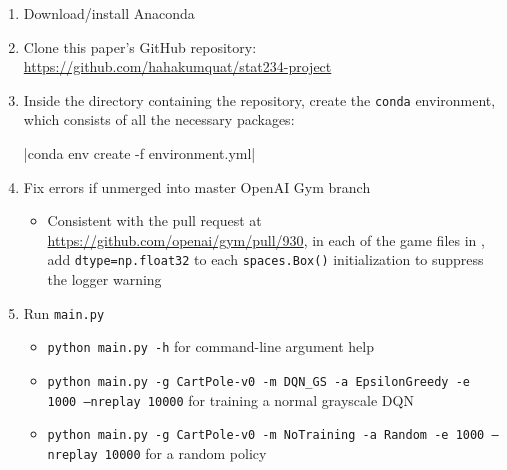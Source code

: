 \documentclass[11pt]{article}
\begin{document}
\begin{enumerate}
    \item Download/install Anaconda
    
    \item Clone this paper's GitHub repository: \url{https://github.com/hahakumquat/stat234-project}
    
    \item Inside the directory containing the repository, create the \texttt{conda} environment, which consists of all the necessary packages: 
    
    |conda env create -f environment.yml|

    \item Fix errors if unmerged into master OpenAI Gym branch
    
    \begin{itemize}
        \item Consistent with the pull request at \url{https://github.com/openai/gym/pull/930}, in each of the game files in , add \texttt{dtype=np.float32} to each \texttt{spaces.Box()} initialization to suppress the logger warning
    \end{itemize}
    
    \item Run \texttt{main.py}
    
    \begin{itemize}
        \item \texttt{python main.py -h} for command-line argument help
        \item \texttt{python main.py -g CartPole-v0 -m DQN\_GS -a EpsilonGreedy -e 1000 --nreplay 10000} for training a normal grayscale DQN
        \item \texttt{python main.py -g CartPole-v0 -m NoTraining -a Random -e 1000 --nreplay 10000} for a random policy
    \end{itemize}
\end{enumerate}
\end{document}
